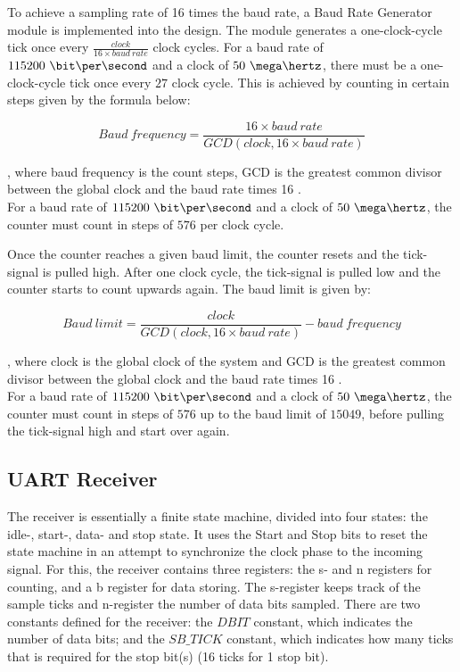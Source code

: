\documentclass[main.tex]{subfiles}
\begin{document}
To achieve a sampling rate of 16 times the baud rate, a Baud Rate Generator module is implemented into the design. The module generates a one-clock-cycle tick once every $\frac{clock}{16 \times baud\ rate}$ clock cycles. For a baud rate of $115200\ \bit\per\second$ and a clock of $50\ \mega\hertz$, there must be a one-clock-cycle tick once every $27$ clock cycle. This is achieved by counting in certain steps given by the formula below:

\begin{equation}
Baud\ frequency = \frac{16 \times baud\ rate}{GCD(clock, 16 \times baud\ rate)}
\end{equation}

, where baud frequency is the count steps, GCD is the greatest common divisor between the global clock and the baud rate times 16 \cite{velure10}. \\
For a baud rate of $115200\ \bit\per\second$ and a clock of $50\ \mega\hertz$, the counter must count in steps of $576$ per clock cycle. 

Once the counter reaches a given baud limit, the counter resets and the tick-signal is pulled high. After one clock cycle, the tick-signal is pulled low and the counter starts to count upwards again. The baud limit is given by:

\begin{equation}
Baud\ limit= \frac{clock}{GCD(clock, 16 \times baud\ rate)} - baud\ frequency
\end{equation}

, where clock is the global clock of the system and GCD is the greatest common divisor between the global clock and the baud rate times 16 \cite{velure10}. \\
For a baud rate of $115200\ \bit\per\second$ and a clock of $50\ \mega\hertz$, the counter must count in steps of $576$ up to the baud limit of $15049$, before pulling the tick-signal high and start over again. 

\subsection{UART Receiver}
The receiver is essentially a finite state machine, divided into four states: the idle-, start-, data- and stop state. It uses the Start and Stop bits to reset the state machine in an attempt to synchronize the clock phase to the incoming signal. For this, the receiver contains three registers: the s- and  n registers for counting, and a b register for data storing. The s-register keeps track of the sample ticks and n-register the number of data bits sampled.
There are two constants defined for the receiver: the $DBIT$ constant, which indicates the number of data bits; and the $SB\_TICK$ constant, which indicates how many ticks that is required for the stop bit(s) (16 ticks for 1 stop bit). 
\end{document}
